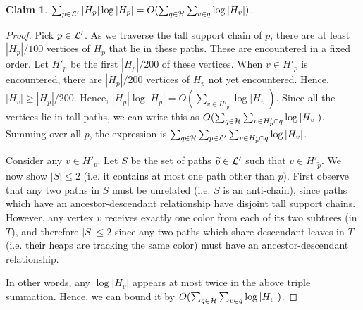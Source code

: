 \documentclass[11pt]{article}
\newtheorem{claim}[theorem]{Claim}
\theoremstyle{definition}
\newcommand{\cH}{{\cal H}}
\newcommand{\cL}{{\cal L}}
\newcommand{\Lem}[1]{\hyperref[lem:#1]{Lemma~\ref*{lem:#1}}} %
\begin{document}
\begin{claim} \label{clm:above} $\sum_{p \in \cL'} |H_p| \log |H_p| = O(\sum_{q \in \cH} \sum_{v \in q} \log |H_v|)$.
\end{claim}

\begin{proof} 
Pick $p \in \cL'$. 
%
%
As we traverse the tall support chain of $p$, there
are at least $|H_p|/100$ vertices of $H_p$ that lie in these paths. These are encountered in
a fixed order. Let $H'_p$ be the first $|H_p|/200$ of these vertices. When $v \in H'_p$
is encountered, there are $|H_p|/200$ vertices of $H_p$ not yet encountered. Hence,
$|H_v| \geq |H_p|/200$. Hence, $|H_p|\log |H_p| = O(\sum_{v \in H'_p} \log |H_v|)$.
Since all the vertices lie in tall paths,
we can write this as $O(\sum_{q \in \cH} \sum_{v \in H'_p \cap q} \log |H_v|)$.
Summing over all $p$, the expression is $\sum_{q \in \cH} \sum_{p \in \cL'} \sum_{v \in H'_p \cap q} \log |H_v|$.

Consider any $v \in H'_p$.  Let $S$ be the set of paths $\widetilde{p}\in \cL'$ such that 
$v\in H'_{\widetilde{p}}$.  We now show $|S|\leq 2$ (i.e. it contains at most one path other than $p$).
First observe that any two paths in $S$ must be unrelated (i.e. $S$ is an anti-chain), 
since paths which have an ancestor-descendant relationship have disjoint tall support chains.  
However, any vertex $v$ receives exactly one color from each of its two subtrees (in $T$), and therefore $|S|\leq 2$ since any two 
paths which share descendant leaves in $T$ (i.e. their heaps are tracking the same color) must have an ancestor-descendant relationship.

In other words, any $\log |H_v|$ appears at most twice in the above triple summation.
Hence, we can bound it by $O(\sum_{q \in \cH} \sum_{v \in q} \log |H_v|)$.
%
%
\end{proof}
\end{document}
